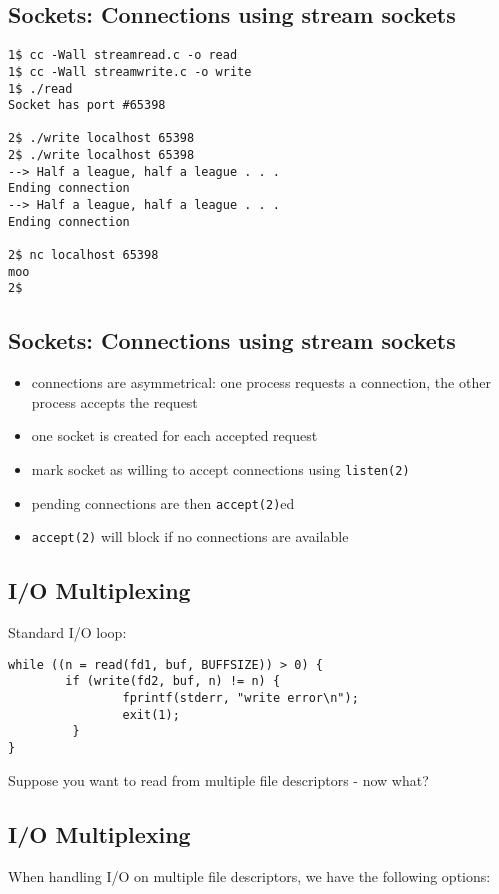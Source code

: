 \documentclass[xga]{xdvislides}
\begin{document}
\subsection{Sockets: Connections using stream sockets}
\begin{verbatim}
1$ cc -Wall streamread.c -o read
1$ cc -Wall streamwrite.c -o write
1$ ./read
Socket has port #65398

2$ ./write localhost 65398
2$ ./write localhost 65398
--> Half a league, half a league . . .
Ending connection
--> Half a league, half a league . . .
Ending connection

2$ nc localhost 65398
moo
2$
\end{verbatim}
\vfill

\subsection{Sockets: Connections using stream sockets}
\begin{itemize}
	\item connections are asymmetrical:  one process requests a connection,
		the other process accepts the request
	\item one socket is created for each accepted request
	\item mark socket as willing to accept connections using {\tt listen(2)}
	\item pending connections are then {\tt accept(2)}ed
	\item {\tt accept(2)} will block if no connections are available
\end{itemize}

\subsection{I/O Multiplexing}
Standard I/O loop:
\begin{verbatim}
while ((n = read(fd1, buf, BUFFSIZE)) > 0) {
        if (write(fd2, buf, n) != n) {
                fprintf(stderr, "write error\n");
                exit(1);
         }
}
\end{verbatim}

Suppose you want to read from multiple file descriptors - now what?



\subsection{I/O Multiplexing}
When handling I/O on multiple file descriptors, we have the following
options:
\end{document}
